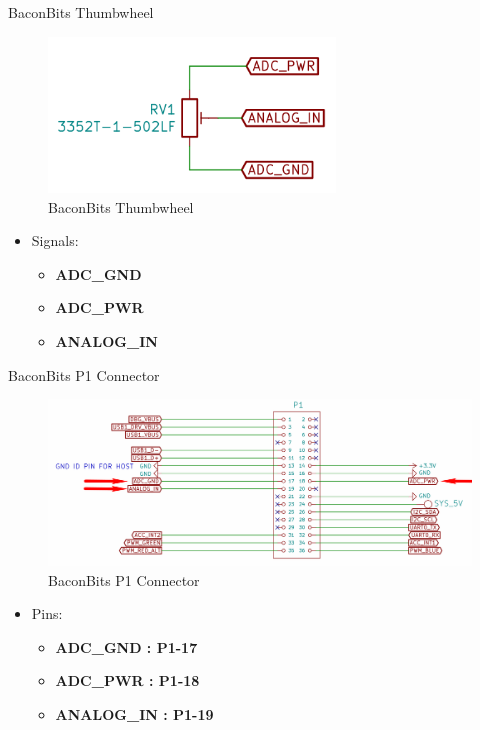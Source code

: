 \begin{frame}
	{BaconBits Thumbwheel}
	     \begin{figure}[H]
		     \includegraphics[width=3in]{IMAGES/baconbits-thumbwheel}
				       \caption{BaconBits Thumbwheel}
	     \end{figure}
	     \begin{itemize}
		     \item
		Signals:
	\begin{itemize}
		\item
			\textbf{ADC\_GND}
		\item
			\textbf{ADC\_PWR}
		\item
			\textbf{ANALOG\_IN}
	\end{itemize}
	\end{itemize}


\end{frame}

\begin{frame}
	{BaconBits P1 Connector}
	     \begin{figure}[H]
		     \includegraphics[width=4.5in]{IMAGES/baconbits-p1-annotated}
				       \caption{BaconBits P1 Connector}
	     \end{figure}
	     \begin{itemize}
		     \item
		Pins:
	\begin{itemize}
		\item
			\textbf{ADC\_GND : P1-17}
		\item
			\textbf{ADC\_PWR : P1-18}
		\item
			\textbf{ANALOG\_IN : P1-19}
	\end{itemize}
	\end{itemize}
\end{frame}
